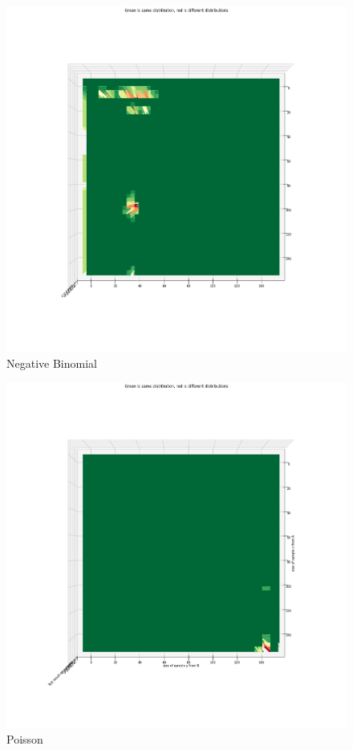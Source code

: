 \begin{figure}[htb]
  \centering
  \includegraphics[width=\linewidth]{./img/hypothesis_test/appendix/ks_neg_bin.png}
  \caption{Negative Binomial}
\end{figure}
\clearpage
\begin{figure}[htb]
  \centering
  \includegraphics[width=\linewidth]{./img/hypothesis_test/appendix/ks_poisson.png}
  \caption{Poisson}
\end{figure}
